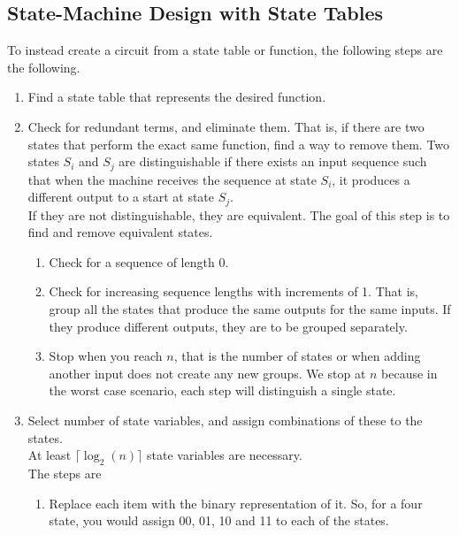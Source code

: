\documentclass[nobib]{tufte-handout}
\begin{document}
    \subsection{State-Machine Design with State Tables}
    To instead create a circuit from a state table or function, the following steps
    are the following.
    \begin{enumerate}
        \item Find a state table that represents the desired function.
        \item Check for redundant terms, and eliminate them. That is, if there are two states
              that perform the exact same function, find a way to remove them. Two states
              $S_i$ and $S_j$ are distinguishable if there exists an input sequence such that
              when the machine receives the sequence at state $S_i$, it produces a different
              output to a start at state $S_j$.\\ If they are not distinguishable, they are
              equivalent. The goal of this step is to find and remove equivalent states.\\
              \begin{enumerate}
                  \item Check for a sequence of length 0.
                  \item Check for increasing sequence lengths with increments of 1. That is, group all
                        the states that produce the same outputs for the same inputs. If they produce
                        different outputs, they are to be grouped separately.
                  \item Stop when you reach $n$, that is the number of states or when adding another
                        input does not create any new groups. We stop at $n$ because in the worst case
                        scenario, each step will distinguish a single state.
              \end{enumerate}
        \item Select number of state variables, and assign combinations of these to the
              states.\\ At least $\lceil \log_2(n)\rceil$ state variables are necessary.\\
              The steps are \begin{enumerate}
                  \item Replace each item with the binary representation of it. So, for a four state,
                        you would assign 00, 01, 10 and 11 to each of the states.

\end{enumerate}
\end{enumerate}
\end{document}

